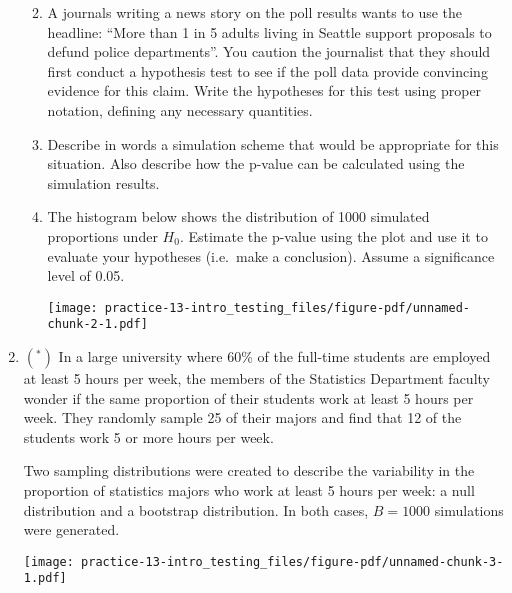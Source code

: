 \documentclass[
  letterpaper,
  DIV=11,
  numbers=noendperiod]{scrartcl}
\begin{document}
\begin{enumerate}
  \begin{enumerate}
  \def\labelenumii{\alph{enumii}.}
  \item
    A journals writing a news story on the poll results wants to use the
    headline: ``More than 1 in 5 adults living in Seattle support
    proposals to defund police departments''. You caution the journalist
    that they should first conduct a hypothesis test to see if the poll
    data provide convincing evidence for this claim. Write the
    hypotheses for this test using proper notation, defining any
    necessary quantities.
  \item
    Describe in words a simulation scheme that would be appropriate for
    this situation. Also describe how the p-value can be calculated
    using the simulation results.
  \item
    The histogram below shows the distribution of 1000 simulated
    proportions under \(H_{0}\). Estimate the p-value using the plot and
    use it to evaluate your hypotheses (i.e.~make a conclusion). Assume
    a significance level of 0.05.

    \texttt{[image: practice-13-intro\_testing\_files/figure-pdf/unnamed-chunk-2-1.pdf]}
  \end{enumerate}
\item
  \((^*)\) In a large university where 60\% of the full-time students
  are employed at least 5 hours per week, the members of the Statistics
  Department faculty wonder if the same proportion of their students
  work at least 5 hours per week. They randomly sample 25 of their
  majors and find that 12 of the students work 5 or more hours per week.

  Two sampling distributions were created to describe the variability in
  the proportion of statistics majors who work at least 5 hours per
  week: a null distribution and a bootstrap distribution. In both cases,
  \(B=1000\) simulations were generated.

  \texttt{[image: practice-13-intro\_testing\_files/figure-pdf/unnamed-chunk-3-1.pdf]}


\end{enumerate}
\end{document}
